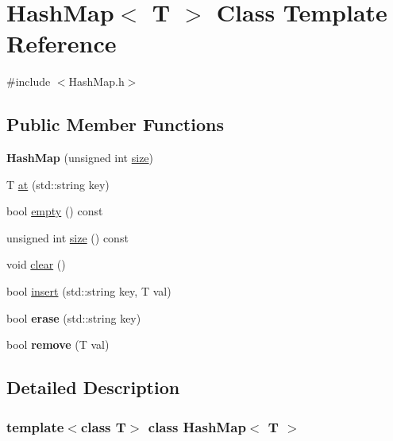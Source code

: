\hypertarget{class_hash_map}{}\section{Hash\+Map$<$ T $>$ Class Template Reference}
\label{class_hash_map}


{\ttfamily \#include $<$Hash\+Map.\+h$>$}

\subsection*{Public Member Functions}
\begin{DoxyCompactItemize}
\item 
\mbox{\label{class_hash_map_a88445c3b07d2b002ad2ca6521a67c6dc}} 
{\bfseries Hash\+Map} (unsigned int \hyperlink{class_hash_map_a1966ffac76bb402b771945c11b8b719a}{size})
\item 
T \hyperlink{class_hash_map_a385f0d379383ddbc05d72662b16568ed}{at} (std\+::string key)
\item 
bool \hyperlink{class_hash_map_a6dfff726611e1ae80744fc54947b424b}{empty} () const
\item 
unsigned int \hyperlink{class_hash_map_a1966ffac76bb402b771945c11b8b719a}{size} () const
\item 
void \hyperlink{class_hash_map_a7b78aa9f52a7524edc644920dc90fa94}{clear} ()
\item 
bool \hyperlink{class_hash_map_afc54cf92ed5d52409460f2b1de4d8ecd}{insert} (std\+::string key, T val)
\item 
\mbox{\label{class_hash_map_aa5c1c725b7a322f1071cc661fd218696}} 
bool {\bfseries erase} (std\+::string key)
\item 
\mbox{\label{class_hash_map_ac8b050114705c0cabaa1a68b0312afd3}} 
bool {\bfseries remove} (T val)
\end{DoxyCompactItemize}


\subsection{Detailed Description}
\subsubsection*{template$<$class T$>$\newline
class Hash\+Map$<$ T $>$}

